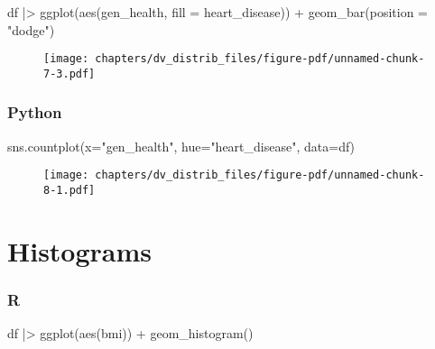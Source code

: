 \documentclass[
  letterpaper,
  DIV=11,
  numbers=noendperiod]{scrreprt}
\newenvironment{Shaded}{\begin{snugshade}}{\end{snugshade}}
\newcommand{\AttributeTok}[1]{\textcolor[rgb]{0.40,0.46,0.14}{#1}}
\newcommand{\FunctionTok}[1]{\textcolor[rgb]{0.28,0.35,0.67}{#1}}
\newcommand{\NormalTok}[1]{\textcolor[rgb]{0.00,0.46,0.62}{#1}}
\newcommand{\OperatorTok}[1]{\textcolor[rgb]{0.37,0.37,0.37}{#1}}
\newcommand{\SpecialCharTok}[1]{\textcolor[rgb]{0.37,0.37,0.37}{#1}}
\newcommand{\StringTok}[1]{\textcolor[rgb]{0.13,0.47,0.30}{#1}}
\begin{document}
\begin{Shaded}
\begin{Highlighting}[]
\NormalTok{df }\SpecialCharTok{|\textgreater{}} 
    \FunctionTok{ggplot}\NormalTok{(}\FunctionTok{aes}\NormalTok{(gen\_health, }\AttributeTok{fill =}\NormalTok{ heart\_disease)) }\SpecialCharTok{+}
    \FunctionTok{geom\_bar}\NormalTok{(}\AttributeTok{position =} \StringTok{"dodge"}\NormalTok{)}
\end{Highlighting}
\end{Shaded}

\begin{figure}[H]

{\centering \texttt{[image: chapters/dv\_distrib\_files/figure-pdf/unnamed-chunk-7-3.pdf]}

}

\end{figure}

\hypertarget{python-45}{%
\subsubsection{Python}\label{python-45}}

\begin{Shaded}
\begin{Highlighting}[]
\NormalTok{sns.countplot(x}\OperatorTok{=}\StringTok{"gen\_health"}\NormalTok{, hue}\OperatorTok{=}\StringTok{"heart\_disease"}\NormalTok{, data}\OperatorTok{=}\NormalTok{df)}
\end{Highlighting}
\end{Shaded}

\begin{figure}[H]

{\centering \texttt{[image: chapters/dv\_distrib\_files/figure-pdf/unnamed-chunk-8-1.pdf]}

}

\end{figure}

\hypertarget{histograms}{%
\section{Histograms}\label{histograms}}

\hypertarget{r-46}{%
\subsubsection{R}\label{r-46}}

\begin{Shaded}
\begin{Highlighting}[]
\NormalTok{df }\SpecialCharTok{|\textgreater{}} 
    \FunctionTok{ggplot}\NormalTok{(}\FunctionTok{aes}\NormalTok{(bmi)) }\SpecialCharTok{+}
    \FunctionTok{geom\_histogram}\NormalTok{()}
\end{Highlighting}
\end{Shaded}
\end{document}
